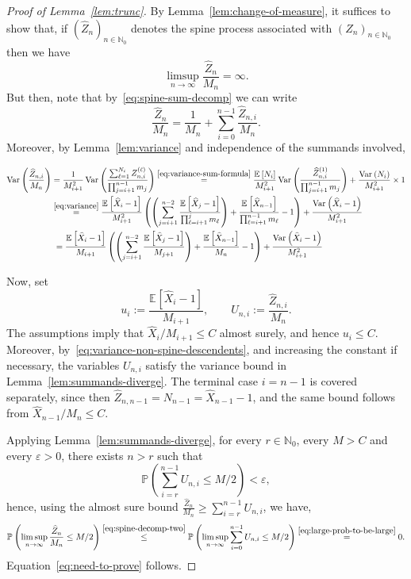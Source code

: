 \documentclass[12pt]{article}
\theoremstyle{definition}
\newcommand{\E}[2][]{\ensuremath{\mathbb{E}_{#1}\left[#2 \right]}}
\newcommand{\Prob}[2][]{\ensuremath{\mathbb{P}_{#1} \left(#2 \right)}}
\newcommand{\Var}[2][]{\operatorname{Var}_{#1}\left(#2\right)}
\newcommand{\eps}{\varepsilon}
\begin{document}
\begin{proof}[Proof of Lemma~\ref{lem:trunc}]
    By Lemma~\ref{lem:change-of-measure}, it suffices to show that, if $(\widehat{Z}_{n})_{n \in \mathbb{N}_0}$ denotes the spine process associated with $(Z_{n})_{n \in \mathbb{N}_0}$ then we have
    \begin{equation} \label{eq:need-to-prove}
    \limsup_{n \to \infty} \frac{\widehat{Z}_n}{M_n} = \infty. 
    \end{equation}
    But then, note that by~\eqref{eq:spine-sum-decomp} we can write 
    \begin{equation} \label{eq:spine-decomp-two}
    \frac{\widehat{Z}_n}{M_n} = \frac{1}{M_n} + \sum_{i=0}^{n-1}\frac{\widehat{Z}_{n,i}}{M_n}.
    \end{equation}
    Moreover, by Lemma~\ref{lem:variance} and independence of the summands involved,
\begin{linenomath}
\begin{align} \label{eq:variance-non-spine-descendents}
\nonumber \Var{\frac{\widehat{Z}_{n, i}}{M_{n}}} & = \frac{1}{M_{i+1}^2} \Var{\frac{\sum_{\ell=1}^{N_{i}}Z^{(\ell)}_{n,i}}{\prod_{j=i+1}^{n-1} m_{j}}} \stackrel{\eqref{eq:variance-sum-formula}}{=} \frac{\E{N_{i}}}{M_{i+1}^2} \Var{\frac{\widehat{Z}^{(1)}_{n,i}}{\prod_{j=i+1}^{n-1} m_{j}}} + \frac{\Var{N_{i}}}{M_{i+1}^2} \times 1
\\ & \nonumber \stackrel{\eqref{eq:variance}}{=} \frac{\E{\widehat{X}_i - 1}}{M_{i+1}^2} \left(\left(\sum_{j=i+1}^{n-2} \frac{\E{\widehat{X}_{j} - 1}}{\prod_{\ell=i+1}^{j} m_{\ell}}\right) + \frac{\E{\widehat{X}_{n-1}}}{\prod_{\ell=i+1}^{n-1} m_{\ell}} - 1 \right) + \frac{\Var{\widehat{X}_i - 1}}{M^2_{i+1}} 
\\ & \hspace{1.05mm} = \frac{\E{\widehat{X}_i - 1}}{M_{i+1}} \left(\left(\sum_{j=i+1}^{n-2} \frac{\E{\widehat{X}_{j} - 1}}{M_{j+1}}\right) + \frac{\E{\widehat{X}_{n-1}}}{M_{n}} - 1 \right) + \frac{\Var{\widehat{X}_i - 1}}{M^2_{i+1}}
\end{align}
\end{linenomath}
Now, set
\[
u_i:=\frac{\E{\widehat X_i-1}}{M_{i+1}},
\qquad
U_{n,i}:=\frac{\widehat Z_{n,i}}{M_n}.
\]
The assumptions imply that $\widehat X_i/M_{i+1}\leq C$ almost surely, and hence $u_i\leq C$. Moreover, by~\eqref{eq:variance-non-spine-descendents}, and increasing the constant if necessary, the variables $U_{n,i}$ satisfy the variance bound in Lemma~\ref{lem:summands-diverge}. The terminal case $i=n-1$ is covered separately, since then $\widehat Z_{n,n-1}=N_{n-1}=\widehat X_{n-1}-1$, and the same bound follows from $\widehat X_{n-1}/M_n\leq C$.

Applying Lemma~\ref{lem:summands-diverge}, for every $r\in\mathbb{N}_0$, every $M>C$ and every $\varepsilon>0$, there exists $n>r$ such that
\[
\Prob{\sum_{i=r}^{n-1}U_{n,i}\leq M/2}<\eps,
\]
hence, using the almost sure bound $\frac{\widehat Z_n}{M_n}
\geq
\sum_{i=r}^{n-1}U_{n,i}$, we have, 
    \[
    \Prob{\limsup_{n \to \infty} \frac{\widehat{Z}_{n}}{M_n} \leq M/2} \stackrel{\eqref{eq:spine-decomp-two}}{\leq} \Prob{\limsup_{n \to \infty} \sum_{i=0}^{n-1} U_{n,i} \leq M/2}  \stackrel{\eqref{eq:large-prob-to-be-large}}{=} 0.
    \]
    Equation~\eqref{eq:need-to-prove} follows. 
\end{proof}
\end{document}
